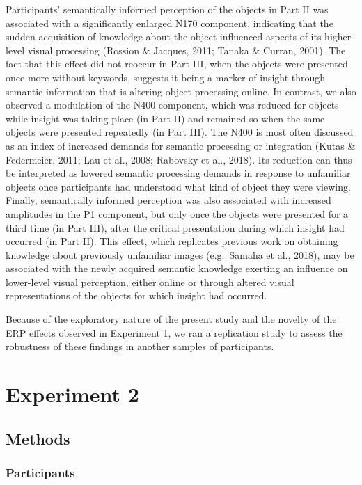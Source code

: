 \documentclass[
  english,
  man,11pt,floatsintext]{apa7}
\begin{document}
Participants' semantically informed perception of the objects in Part II was associated with a significantly enlarged N170 component, indicating that the sudden acquisition of knowledge about the object influenced aspects of its higher-level visual processing (Rossion \& Jacques, 2011; Tanaka \& Curran, 2001). The fact that this effect did not reoccur in Part III, when the objects were presented once more without keywords, suggests it being a marker of insight through semantic information that is altering object processing online. In contrast, we also observed a modulation of the N400 component, which was reduced for objects while insight was taking place (in Part II) and remained so when the same objects were presented repeatedly (in Part III). The N400 is most often discussed as an index of increased demands for semantic processing or integration (Kutas \& Federmeier, 2011; Lau et al., 2008; Rabovsky et al., 2018). Its reduction can thus be interpreted as lowered semantic processing demands in response to unfamiliar objects once participants had understood what kind of object they were viewing. Finally, semantically informed perception was also associated with increased amplitudes in the P1 component, but only once the objects were presented for a third time (in Part III), after the critical presentation during which insight had occurred (in Part II). This effect, which replicates previous work on obtaining knowledge about previously unfamiliar images (e.g.~Samaha et al., 2018), may be associated with the newly acquired semantic knowledge exerting an influence on lower-level visual perception, either online or through altered visual representations of the objects for which insight had occurred.

Because of the exploratory nature of the present study and the novelty of the ERP effects observed in Experiment 1, we ran a replication study to assess the robustness of these findings in another samples of participants.

\hypertarget{experiment-2}{%
\section{Experiment 2}\label{experiment-2}}

\hypertarget{methods-1}{%
\subsection{Methods}\label{methods-1}}

\hypertarget{participants-1}{%
\subsubsection{Participants}\label{participants-1}}
\end{document}
